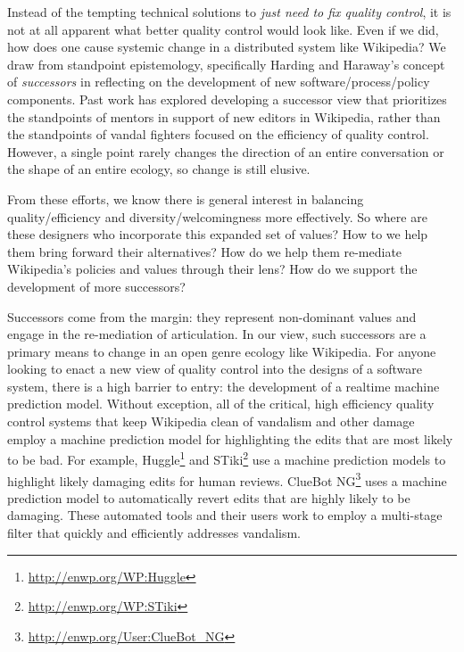Instead of the tempting technical solutions to \emph{just need to fix quality control}, it is not at all apparent what better quality control would look like.  Even if we did, how does one cause systemic change in a distributed system like Wikipedia?  We draw from standpoint epistemology, specifically Harding and Haraway's concept of \emph{successors}\cite{haraway1988situated}\cite{harding1987feminism} in reflecting on the development of new software/process/policy components.  Past work has explored developing a successor view that prioritizes the standpoints of mentors in support of new editors in Wikipedia, rather than the standpoints of vandal fighters focused on the efficiency of quality control\cite{halfaker2014snuggle}\cite{geiger2014successor}. However, a single point rarely changes the direction of an entire conversation or the shape of an entire ecology, so change is still elusive.

From these efforts, we know there is general interest in balancing quality/efficiency and diversity/welcomingness more effectively.  So where are these designers who incorporate this expanded set of values?  How to we help them bring forward their alternatives?  How do we help them re-mediate Wikipedia's policies and values through their lens?  How do we support the development of more successors?

Successors come from the margin: they represent non-dominant values and engage in the re-mediation of articulation\cite{mugar2017preserving}.  In our view, such successors are a primary means to change in an open genre ecology like Wikipedia.  For anyone looking to enact a new view of quality control into the designs of a software system, there is a high barrier to entry: the development of a realtime machine prediction model.  Without exception, all of the critical, high efficiency quality control systems that keep Wikipedia clean of vandalism and other damage employ a machine prediction model for highlighting the edits that are most likely to be bad. For example, Huggle\footnote{\url{http://enwp.org/WP:Huggle}} and STiki\footnote{\url{http://enwp.org/WP:STiki}} use a machine prediction models to highlight likely damaging edits for human reviews.  ClueBot NG\footnote{\url{http://enwp.org/User:ClueBot_NG}} uses a machine prediction model to automatically revert edits that are highly likely to be damaging.  These automated tools and their users work to employ a multi-stage filter that quickly and efficiently addresses vandalism\cite{geiger2013levee}.

